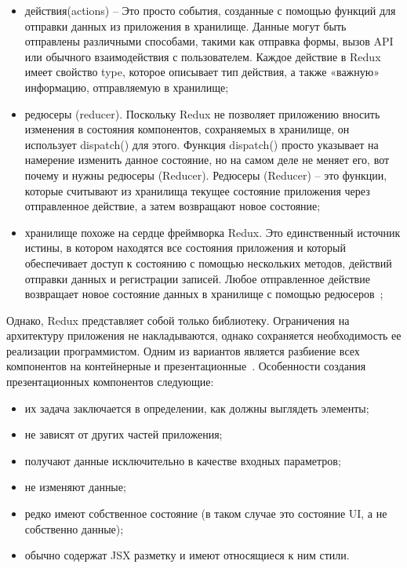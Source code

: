 \begin{itemize}
  \item действия(actions) -- Это просто события, созданные с помощью функций для отправки данных из приложения в
  хранилище. Данные могут быть отправлены различными способами, такими как отправка формы, вызов API или обычного
  взаимодействия с пользователем. Каждое действие в Redux имеет свойство type, которое описывает тип действия, а также
  «важную» информацию, отправляемую в хранилище;
  \item редюсеры (reducer). Поскольку Redux не позволяет приложению вносить изменения в состояния компонентов,
  сохраняемых в хранилище, он использует dispatch() для этого. Функция dispatch() просто указывает на намерение изменить
  данное состояние, но на самом деле не меняет его, вот почему и нужны редюсеры (Reducer).
  Редюсеры (Reducer) – это функции, которые считывают из хранилища текущее состояние приложения через отправленное
  действие, а затем возвращают новое состояние;
  \item хранилище похоже на сердце фреймворка Redux. Это единственный источник истины, в котором находятся все состояния
  приложения и который обеспечивает доступ к состоянию с помощью нескольких методов, действий отправки данных и
  регистрации записей. Любое отправленное действие возвращает новое состояние  данных в хранилище с помощью
  редюсеров~\cite{redux};
\end{itemize}

Однако, Redux представляет собой только библиотеку. Ограничения на архитектуру приложения не накладываются, однако
сохраняется необходимость ее реализации программистом. Одним из вариантов является разбиение всех компонентов на
контейнерные и презентационные~\cite{presentational_and_container_components}. Особенности создания презентационных
компонентов следующие:

\begin{itemize}
	\item их задача заключается в определении, как должны выглядеть элементы;
	\item не зависят от других частей приложения;
	\item получают данные исключительно в качестве входных параметров;
	\item не изменяют данные;
	\item редко имеют собственное состояние (в таком случае это состояние UI, а не собственно данные);
	\item обычно содержат JSX разметку и имеют относящиеся к ним стили.
\end{itemize}

